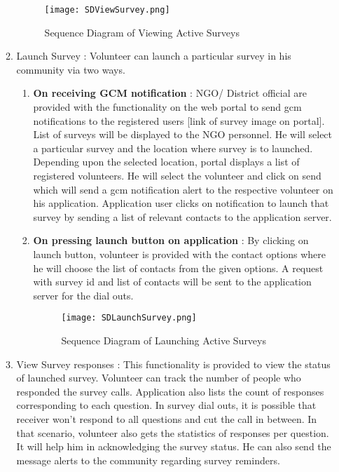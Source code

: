 \begin{itemize}
\begin{enumerate}
\begin{figure}[H]
    \centering
	\texttt{[image: SDViewSurvey.png]}
    \caption{ Sequence Diagram of Viewing Active Surveys}
    \label{fig:Sequence Diagram of Viewing Active Surveys}
\end{figure}

	\item{Launch Survey} : Volunteer can launch a particular survey in his community via two ways.
	
\begin{enumerate}
	\item\textbf{On receiving GCM notification} : NGO/ District official are provided with the functionality on the web portal to send gcm notifications to the registered users [link of survey image on portal]. List of surveys will be displayed to the NGO personnel. He will select a particular survey and the location where survey is to launched. Depending upon the selected location, portal displays a list of registered volunteers. He will select the volunteer and click on send which will send a gcm notification alert to the respective volunteer on his application. Application user clicks on notification to launch that survey by sending a list of relevant contacts to the application server.


	\item\textbf{On pressing launch button on application} : By clicking on launch button, volunteer is provided with the contact options where he will choose the list of contacts from the given options. A request with survey id and list of contacts  will be sent to the application server for the dial outs.

\begin{figure}[H]
    \centering
	\texttt{[image: SDLaunchSurvey.png]}
    \caption{ Sequence Diagram of Launching Active Surveys}
    \label{fig:Sequence Diagram of Launching Active Surveys}
\end{figure}
	\end{enumerate}


\item {View Survey responses} :  This functionality is provided to view the status of launched survey. Volunteer can track the number of people who responded the survey calls. Application also lists the count of responses corresponding to each question. In survey dial outs, it is possible that receiver won’t respond to all questions and cut the call in between.  In that scenario, volunteer also gets the statistics of responses per question. It will help him in acknowledging the survey status. He can also send the message alerts to the community regarding survey reminders.
\end{enumerate}


\end{itemize}
